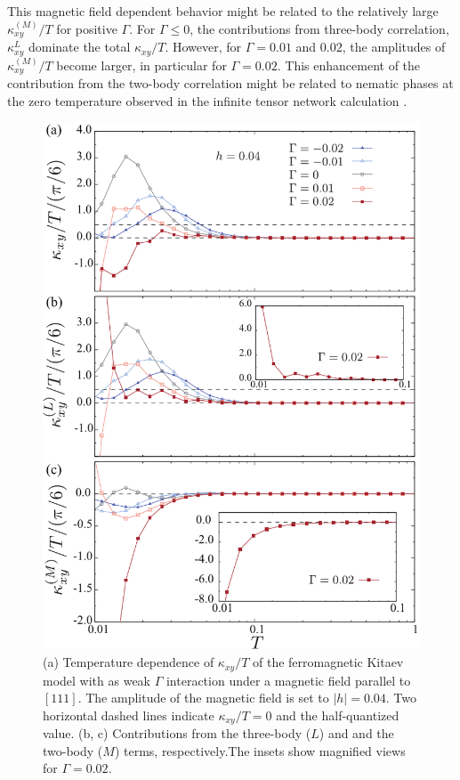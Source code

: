 \documentclass[reprint,amsmath,amssymb,aps,prx]{revtex4-2}
\begin{document}
This magnetic field dependent behavior might be related to the relatively large $\kappa_{xy}^{(M)}/T$ for positive $\Gamma$. For $\Gamma \le 0$, the contributions from three-body correlation, $\kappa_{xy}^{L}$ dominate the total $\kappa_{xy}/T$. However, for $\Gamma = 0.01$ and $0.02$, the amplitudes of $\kappa_{xy}^{(M)}/T$ become larger, in particular for $\Gamma = 0.02$. This enhancement of the contribution from the two-body correlation might be related to nematic phases at the zero temperature observed in the infinite tensor network calculation \cite{LeeKCOYKK2020}.

\begin{figure}
  \begin{center}
    \includegraphics[width=0.9\linewidth]{Figs/plot_k_all_h0.04_G.pdf}
  \end{center}
  \caption{(a) Temperature dependence of $\kappa_{xy}/T$ of the ferromagnetic Kitaev model with as weak $\Gamma$ interaction under a magnetic field parallel to $[111]$. The amplitude of the magnetic field is set to $|h|=0.04$. Two horizontal dashed lines indicate $\kappa_{xy}/T = 0$ and the half-quantized value. (b, c) Contributions from the three-body ($L$) and and the two-body ($M$) terms, respectively.The insets show magnified views for $\Gamma = 0.02$.}
  \label{fig:k_all_h0.04_G}
\end{figure}
\end{document}
